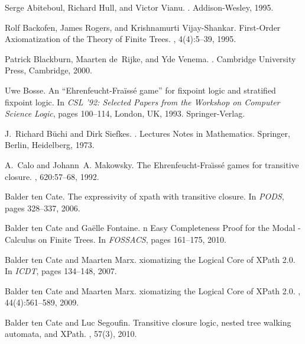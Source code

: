 \documentclass{LMCS}
\begin{document}
\begin{thebibliography}{10}

Serge Abiteboul, Richard Hull, and Victor Vianu.
.
\newblock Addison-Wesley, 1995.

Rolf Backofen, James Rogers, and Krishnamurti Vijay-Shankar.
 {F}irst-{O}rder {A}xiomatization of the {T}heory of {F}inite
  {T}rees.
, 4(4):5--39, 1995.

Patrick Blackburn, Maarten de~Rijke, and Yde Venema.
.
\newblock Cambridge University Press, Cambridge, 2000.

Uwe Bosse.
\newblock An ``{E}hrenfeucht-{F}ra\"{i}ss\'{e} game'' for fixpoint logic and
  stratified fixpoint logic.
\newblock In {\em CSL '92: Selected Papers from the Workshop on Computer
  Science Logic}, pages 100--114, London, UK, 1993. Springer-Verlag.

J.~Richard B\"{u}chi and Dirk Siefkes.
.
\newblock Lectures Notes in Mathematics. Springer, Berlin, Heidelberg, 1973.

A.~Calo and Johann~A. Makowsky.
\newblock The {E}hrenfeucht-{F}ra\"{\i}ss\'e games for transitive closure.
, 620:57--68, 1992.

{Balder ten} Cate.
\newblock The expressivity of xpath with transitive closure.
\newblock In {\em PODS}, pages 328--337, 2006.

{Balder ten} Cate and Ga{\"e}lle Fontaine.
n {E}asy {C}ompleteness {P}roof for the {M}odal -{C}alculus
  on {F}inite {T}rees.
\newblock In {\em FOSSACS}, pages 161--175, 2010.

{Balder ten} Cate and Maarten Marx.
xiomatizing the {L}ogical {C}ore of {X}{P}ath 2.0.
\newblock In {\em ICDT}, pages 134--148, 2007.

{Balder ten} Cate and Maarten Marx.
xiomatizing the {L}ogical {C}ore of {X}{P}ath 2.0.
, 44(4):561--589, 2009.

{Balder ten} Cate and Luc Segoufin.
\newblock Transitive closure logic, nested tree walking automata, and
  {X}{P}ath.
, 57(3), 2010.


\end{thebibliography}
\end{document}
